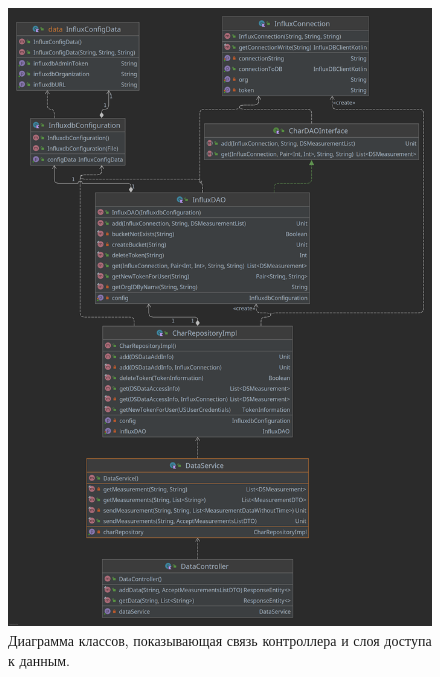 \begin{figure}[H]
	\centering
	\includegraphics[width=\textwidth]{img/dataAndControllerLinkageDiagram.png}
	\caption{Диаграмма классов, показывающая связь контроллера и слоя доступа к данным. }
	\label{fig:dataAndController}
\end{figure}

